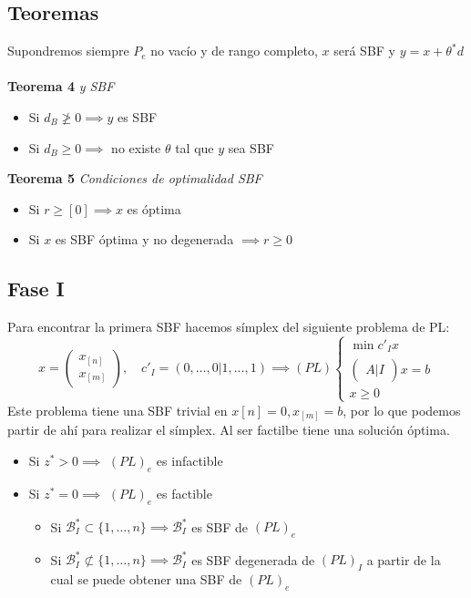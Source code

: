 \documentclass{myclass}
\begin{document}
\subsection{Teoremas}
Supondremos siempre $P_e$ no vacío y de rango completo, $x$ será SBF y $y=x+\theta^*d$ \\
\\
\textbf{Teorema 4} \textit{y SBF}
\begin{itemize}
    \item Si $d_B\ngeq0 \implies y$ es SBF
    \item Si $d_B\geq 0 \implies $ no existe $\theta$ tal que $y$ sea SBF
\end{itemize}
\textbf{Teorema 5} \textit{Condiciones de optimalidad SBF}
\begin{itemize}
    \item Si $r\geq [0] \implies x$ es óptima
    \item Si $x$ es SBF óptima y no degenerada $\implies r\geq 0$ 
\end{itemize}

\subsection{Fase I}
Para encontrar la primera SBF hacemos símplex del siguiente problema de PL:
$$
x = \begin{pmatrix} x_{[n]} \\ x_{[m]} \end{pmatrix}, \quad
c'_I = (0,\ldots,0|1, \ldots, 1)
\implies 
(PL)
\begin{cases}
    \min c'_Ix \\
    \begin{pmatrix} A  |  I \end{pmatrix} x = b \\
    x\geq 0
\end{cases}
$$
Este problema tiene una SBF trivial en $x{[n]} = 0, x_{[m]} = b$, por lo que podemos partir de ahí para realizar el símplex. Al ser factilbe tiene una solución óptima.
\begin{itemize}
    \item Si $z^*>0 \implies$ $(PL)_e$ es infactible
    \item Si $z^*=0 \implies$ $(PL)_e$ es factible
    \begin{itemize}
        \item Si $\mathcal{B}^*_I \subset \{1, \ldots , n\} \implies \mathcal{B}^*_I$ es SBF de $(PL)_e$
        \item Si $\mathcal{B}^*_I \not\subset \{1, \ldots , n\} \implies \mathcal{B}^*_I$ es SBF degenerada de $(PL)_I$ a partir de la cual se puede obtener una SBF de $(PL)_e$
    \end{itemize}
\end{itemize}
\end{document}
